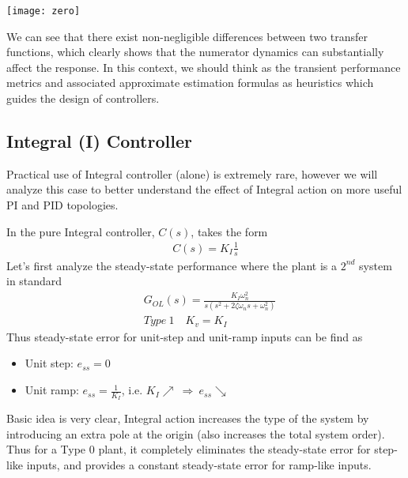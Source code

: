 \documentclass[twoside]{article}
\begin{document}
\vspace{12 pt}

  \begin{minipage}[h]{1\linewidth}
    \begin{center}
      \texttt{[image: zero]}
    \end{center}
  \end{minipage}

\vspace{12 pt}

We can see that there exist non-negligible differences
between two transfer functions, which clearly shows that
the numerator dynamics can substantially affect the response.
In this context, we should think as the transient performance
metrics and associated approximate estimation formulas 
as heuristics which guides the design of controllers. 

\subsection{Integral (I) Controller}

Practical use of Integral controller (alone) is extremely 
rare, however we will analyze this case to better
understand the effect of Integral action on more useful
PI and PID topologies. 

In the pure Integral controller, $C(s)$, takes the form
%
\begin{align*}
 C(s) = K_I \frac{1}{s}
\end{align*}
%
Let's first analyze the steady-state 
performance where the plant is a $2^{nd}$ system in standard
%
\begin{align*}
  &G_{OL}(s) = \frac{K_I \omega_n^2}{s (s^2 + 2 \zeta
    \omega_n s + \omega_n^2)}
\\
 &Type \ 1 \quad K_v = K_I
\end{align*}
% 
Thus steady-state error for unit-step and unit-ramp inputs can be find
as
\begin{itemize}
\item Unit step: $e_{ss} = 0$ 
\item Unit ramp: $e_{ss} = \frac{1}{K_I}$, i.e. $K_I \nearrow \ \Rightarrow \ e_{ss} \searrow$  
\end{itemize}
Basic idea is very clear, Integral action increases the type of the
system by introducing an extra pole at the origin (also increases the
total system order). Thus for a Type 0 plant, it completely eliminates 
the steady-state error for step-like inputs, and provides a
constant steady-state error for ramp-like inputs. 
\end{document}
